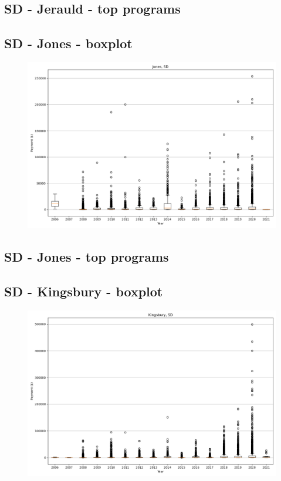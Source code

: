 \subsection*{SD - Jerauld - top programs}

\newpage
\subsection*{SD - Jones - boxplot}
\begin{figure}[h]
\centering
\includegraphics[width=7in]{../output/boxplots/counties/Jones-SD_boxplot.png}
\end{figure}


\subsection*{SD - Jones - top programs}

\newpage
\subsection*{SD - Kingsbury - boxplot}
\begin{figure}[h]
\centering
\includegraphics[width=7in]{../output/boxplots/counties/Kingsbury-SD_boxplot.png}
\end{figure}


